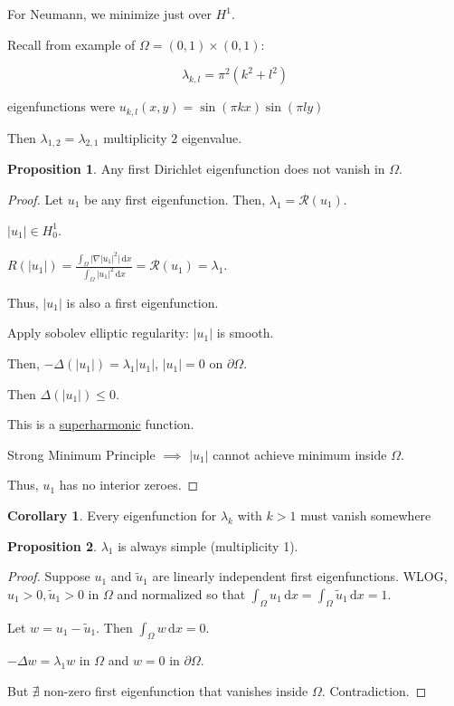 \documentclass{article}
\theoremstyle{definition}
\newtheorem{proposition}{Proposition}
\newtheorem{corollary}{Corollary}
\begin{document}
For Neumann, we minimize just over \(H^1\).

Recall from example of \(\Omega = (0,1) \times (0,1)\):

\[
    \lambda_{k,l} = \pi^2(k^2 + l^2)
\]

eigenfunctions were \(u_{k,l}(x,y) = \sin(\pi k x) \sin(\pi l y)\) 

Then \(\lambda_{1,2} = \lambda_{2,1}\) multiplicity \(2\) eigenvalue.

\begin{proposition}
    Any first Dirichlet eigenfunction does not vanish in \(\Omega\).
\end{proposition}

\begin{proof}
    Let \(u_1\) be any first eigenfunction. Then, \(\lambda_1 = \mathcal{R} (u_1)\).

    \(\vert u_1 \vert \in H^1_0\).

    \(R(\vert u_1 \vert) = \frac{\int_{\Omega} \vert \nabla \vert u_1 \vert ^2 \vert  \,\mathrm{d}x }{\int_{\Omega} \vert u_1 \vert ^2 \,\mathrm{d}x } = \mathcal{R}(u_1) = \lambda_1\).
    
    Thus, \(\vert u_1 \vert \) is also a first eigenfunction.

    Apply  sobolev elliptic regularity: \(\vert u_1 \vert \) is smooth.

    Then, \(- \Delta (\vert u_1 \vert) = \lambda_1 \vert u_1 \vert\), \(\vert u_1 \vert = 0\) on \(\partial \Omega\).
    
    Then \(\Delta (\vert u_1 \vert) \leq 0\).
    
    This is a \underline{superharmonic} function.

    Strong Minimum Principle \(\implies\) \(\vert u_1 \vert\) cannot achieve minimum inside \(\Omega\).

    Thus, \(u_1\) has no interior zeroes.
\end{proof}

\begin{corollary}
    Every eigenfunction for \(\lambda_k\) with \(k > 1\) must vanish somewhere
\end{corollary}

\begin{proposition}
    \(\lambda_1\) is always simple (multiplicity 1).
\end{proposition}

\begin{proof}
    Suppose \(u_1\) and \(\widetilde{u}_1\) are linearly independent first eigenfunctions. WLOG, \(u_1 > 0, \widetilde{u}_1 > 0\) in \(\Omega\) and normalized so that \(\int_{\Omega} u_1 \,\mathrm{d}x = \int_{\Omega} \widetilde{u}_1 \,\mathrm{d}x = 1\).

    Let \(w = u_1 - \widetilde{u}_1\). Then \(\int_{\Omega} w \,\mathrm{d}x = 0\).

    \(- \Delta w = \lambda_1 w\) in \(\Omega\) and \(w = 0\) in \(\partial \Omega\).

    But \(\nexists\) non-zero first eigenfunction that vanishes inside \(\Omega\). Contradiction.  

\end{proof}
\end{document}
